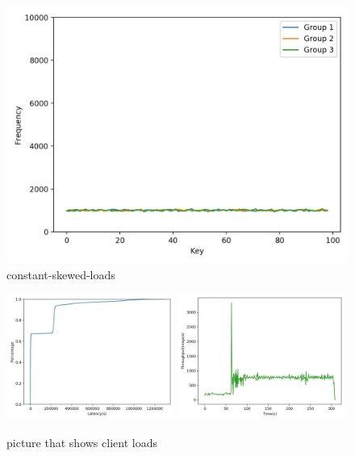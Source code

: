 \begin{figure}[!htb]
  \centering
  \includegraphics[width=\textwidth,height=\textheight,keepaspectratio]{img/clients_loads_constant.png}
  \caption[caption]{ constant-skewed-loads }
  \label{fig:constant-skewed-loads}
\end{figure}

\begin{figure}[!htb]
  \centering
  \includegraphics[width=0.49\textwidth,height=\textheight,keepaspectratio]{img/constant50_lat.png}
  \includegraphics[width=0.49\textwidth,height=\textheight,keepaspectratio]{img/constant50_tp.png}
  \caption[caption]{ picture that shows client loads }
  \label{fig:constant50-performance}
\end{figure}

